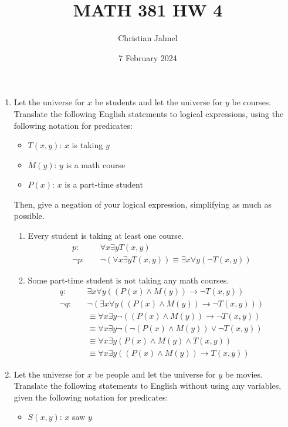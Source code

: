 \documentclass[letterpaper, 12pt]{article}
\title{MATH 381 HW 4}
\author{Christian Jahnel}
\date{7 February 2024}
\newcommand{\then}{\rightarrow}
\begin{document}
\maketitle
\begin{enumerate}
\item Let the universe for $x$ be students and let the universe for $y$ be courses. Translate 
the following English statements to logical expressions, using the following notation for 
predicates:
\begin{itemize}
    \item $T(x, y)$: $x$ is taking $y$
    \item $M(y)$: $y$ is a math course
    \item $P(x)$: $x$ is a part-time student
\end{itemize}
Then, give a negation of your logical expression, simplifying as much as possible.
\begin{enumerate}
\item Every student is taking at least one course.
\begin{align*}
    p: \quad &\forall x \exists y T(x, y) \\
    \neg p: \quad &\neg (\forall x \exists y T(x, y)) \equiv \exists x \forall y (\neg T(x, y))
\end{align*}
\item Some part-time student is not taking any math courses.
\begin{align*}
    q: \quad &\exists x \forall y((P(x) \wedge M(y)) \then \neg T(x, y)) \\
    \neg q: \quad &\neg(\exists x \forall y((P(x) \wedge M(y)) \then \neg T(x, y))) \\
    &\equiv \forall x \exists y \neg ((P(x) \wedge M(y)) \then \neg T(x, y)) \\
    &\equiv \forall x \exists y \neg (\neg (P(x) \wedge M(y)) \vee \neg T(x, y)) \\
    &\equiv \forall x \exists y (P(x) \wedge M(y) \wedge T(x, y)) \\
    &\equiv \forall x \exists y ((P(x) \wedge M(y)) \then T(x, y))
\end{align*}
\end{enumerate}
\item Let the universe for $x$ be people and let the universe for $y$ be movies. Translate the 
following statements to English without using any variables, given the following notation for 
predicates:
\begin{itemize}
\item $S(x, y)$: $x$ saw $y$

\end{itemize}
\end{enumerate}
\end{document}

